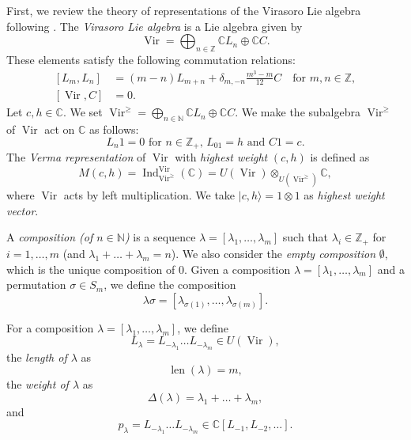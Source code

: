 \documentclass[a4paper, 12pt, reqno]{amsart}
\theoremstyle{remark}
\DeclareMathOperator{\Vir}{Vir}
\DeclareMathOperator{\Ind}{Ind}
\DeclareMathOperator{\len}{len}
\begin{document}
First, we review the theory of representations of the Virasoro Lie algebra following \cite{kac_bombay_2013}.
The \emph{Virasoro Lie algebra} is a Lie algebra given by
\begin{equation*}
  \Vir = \bigoplus_{n \in \mathbb{Z}}\mathbb{C}L_n \oplus \mathbb{C}C.
\end{equation*}
These elements satisfy the following commutation relations:
\begin{equation}
  \label{eq:1}
  \begin{split}
    [L_m, L_n] &= (m - n)L_{m + n} + \delta_{m, -n}\frac{m^3 - m}{12}C \quad \text{for $m, n \in \mathbb{Z}$}, \\
    [\Vir, C] &= 0.
  \end{split}
\end{equation}
Let $c, h \in \mathbb{C}$.
We set $\Vir^{\ge} = \bigoplus_{n \in \mathbb{N}}\mathbb{C}L_n \oplus \mathbb{C}C$.
We make the subalgebra $\Vir^{\ge}$ of $\Vir$ act on $\mathbb{C}$ as follows:
\begin{equation*}
  \text{$L_n1 = 0$ for $n \in \mathbb{Z}_+$, $L_01 = h$ and $C1 = c$}.
\end{equation*}
The \emph{Verma representation} of $\Vir$ with \emph{highest weight} $(c, h)$ is defined as
\begin{equation*}
  M(c, h) = \Ind^{\Vir}_{\Vir^{\ge}}(\mathbb{C}) = U(\Vir) \otimes_{U(\Vir^{\ge})} \mathbb{C},
\end{equation*}
where $\Vir$ acts by left multiplication.
We take $|c, h\rangle = 1 \otimes 1$ as \emph{highest weight vector}.

A \emph{composition (of $n \in \mathbb{N}$)} is a sequence $\lambda = [\lambda_1, \dots, \lambda_m]$ such that $\lambda_i \in \mathbb{Z}_+$ for $i = 1, \dots, m$ (and $\lambda_1 + \dots + \lambda_m = n$).
We also consider the \emph{empty composition} $\emptyset$, which is the unique composition of $0$.
Given a composition $\lambda = [\lambda_1, \dots, \lambda_m]$ and a permutation $\sigma \in S_m$, we define the composition
\begin{equation*}
  \lambda\sigma = [\lambda_{\sigma(1)}, \dots, \lambda_{\sigma(m)}].
\end{equation*}

For a composition $\lambda = [\lambda_1, \dots, \lambda_m]$, we define
\begin{equation*}
  L_{\lambda} = L_{-\lambda_1}\dots L_{-\lambda_m} \in U(\Vir),
\end{equation*}
the \emph{length of $\lambda$} as
\begin{equation*}
  \len(\lambda) = m,
\end{equation*}
the \emph{weight of $\lambda$} as
\begin{equation*}
  \Delta(\lambda) = \lambda_1 + \dots + \lambda_m,
\end{equation*}
and
\begin{equation*}
  p_{\lambda} = L_{-\lambda_1}\dots L_{-\lambda_m} \in \mathbb{C}[L_{-1}, L_{-2}, \dots].
\end{equation*}
\end{document}
